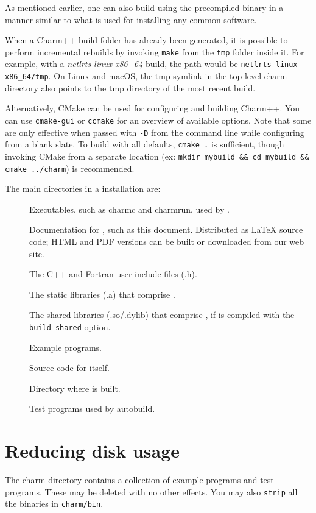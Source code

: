 As mentioned earlier, one can also build \charmpp{} using the precompiled binary
in a manner similar to what is used for installing any common software.

When a Charm++ build folder has already been generated, it is possible to
perform incremental rebuilds by invoking \verb|make| from the \verb|tmp| folder
inside it. For example, with a {\em netlrts-linux-x86\_64} build, the path
would be \verb|netlrts-linux-x86_64/tmp|. On Linux and macOS, the tmp symlink
in the top-level charm directory also points to the tmp directory of the most
recent build.

Alternatively, CMake can be used for configuring and building Charm++. You can
use \verb|cmake-gui| or \verb|ccmake| for an overview of available options.
Note that some are only effective when passed with \verb|-D| from the
command line while configuring from a blank slate. To build with all defaults,
\verb|cmake .| is sufficient, though invoking CMake from a separate location
(ex: \verb|mkdir mybuild && cd mybuild && cmake ../charm|) is recommended.

The main directories in a \charmpp{} installation are:

\begin{description}
\item[]
Executables, such as charmc and charmrun,
used by \charmpp{}.

\item[]
Documentation for \charmpp{}, such as this
document.  Distributed as LaTeX source code; HTML and PDF versions
can be built or downloaded from our web site.

\item[]
The \charmpp{} C++ and Fortran user include files (.h).

\item[]
The static libraries (.a) that comprise \charmpp{}.

\item[]
The shared libraries (.so/.dylib) that comprise \charmpp{},
if \charmpp{} is compiled with the \texttt{--build-shared} option.

\item[]
Example \charmpp{} programs.

\item[]
Source code for \charmpp{} itself.

\item[]
Directory where \charmpp{} is built.

\item[]
Test \charmpp{} programs used by autobuild.

\end{description}

\section{Reducing disk usage}

The charm directory contains a collection of example-programs and
test-programs.  These may be deleted with no other effects. You may
also {\tt strip} all the binaries in {\tt charm/bin}.
